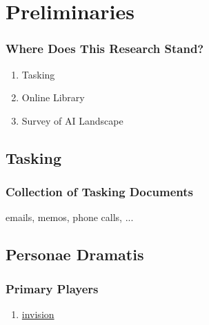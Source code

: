 % 

\section{Preliminaries}
\begin{frame}\frametitle{Where Does This Research Stand?}
	\begin{enumerate}
		\item Tasking
		\item Online Library
		\item Survey of AI Landscape
	\end{enumerate}
\end{frame}

\subsection{Tasking}
\begin{frame}\frametitle{Collection of Tasking Documents}
\center
	emails, memos, phone calls, ...
\end{frame}


\subsection{Personae Dramatis}
\begin{frame}\frametitle{Primary Players}
	\begin{enumerate}
		\item \href{https://invision.ai/}{invision}
	\end{enumerate}
\end{frame}

